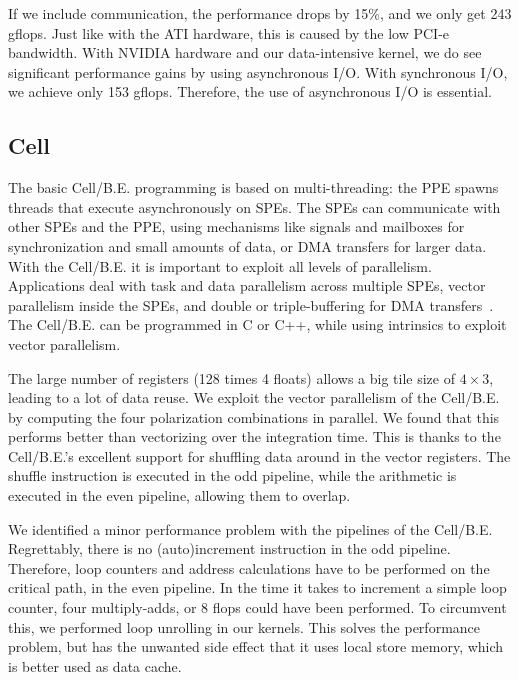 \documentclass{article}
\begin{document}
If we include communication, the performance
drops by 15\%, and we only get 243 gflops. Just like with the ATI hardware,
this is caused by the low PCI-e bandwidth.
With NVIDIA hardware and our data-intensive kernel, we do see significant
performance gains by using asynchronous I/O. With synchronous I/O, we achieve only
153 gflops. Therefore, the use of asynchronous I/O is essential.


\subsection{Cell}


The basic \mbox{Cell/B.E.} programming is based on multi-threading:
the PPE spawns threads that execute asynchronously on SPEs.
The SPEs can
communicate with other SPEs and the PPE, using mechanisms like signals and mailboxes
for synchronization and small amounts of data, or DMA transfers for
larger data.  With the \mbox{Cell/B.E.} it is important to exploit all levels of parallelism.
Applications deal with task and data parallelism across multiple SPEs, vector parallelism
inside the SPEs, and double or triple-buffering for DMA
transfers~\cite{cell}.  The \mbox{Cell/B.E.} can be
programmed in C or C++, while using intrinsics to exploit vector
parallelism.

The large number of registers (128 times 4 floats) allows a big tile size of 
$4\times3$, leading to a lot of data reuse.
We exploit the vector parallelism of the \mbox{Cell/B.E.} by computing the four
polarization combinations in parallel.  We found that this performs
better than vectorizing over the integration time.  This is thanks to the \mbox{Cell/B.E.}'s
excellent support for shuffling data around in the vector registers.
The shuffle instruction is executed
in the odd pipeline, while the arithmetic is executed in the even
pipeline, allowing them to overlap.

We identified a minor performance problem with the pipelines of the
\mbox{Cell/B.E.}  Regrettably, there is no (auto)increment instruction in the odd
pipeline.  Therefore, loop counters and address calculations have to
be performed on the critical path, in the even pipeline. In the time
it takes to increment a simple loop counter, four multiply-adds, or 8
flops could have been performed. To circumvent this, we performed loop
unrolling in our kernels. This solves the performance problem, but has
the unwanted side effect that it uses local store memory, which is
better used as data cache.
\end{document}
